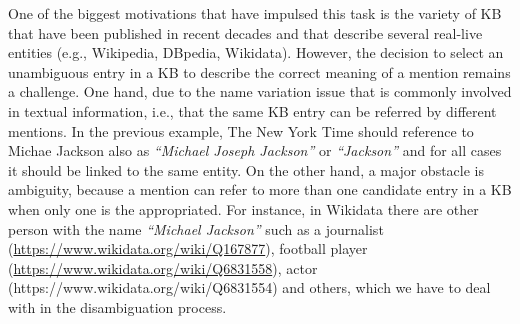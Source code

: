 \documentclass{llncs}
\begin{document}
One of the biggest motivations that have impulsed this task is the variety of KB that have been published in recent decades and that describe several real-live entities (e.g., Wikipedia, DBpedia, Wikidata). However, the decision to select an unambiguous entry in a KB to describe the correct meaning of a mention remains a challenge. One hand, due to the name variation issue that is commonly involved in textual information, i.e., that the same KB entry can be referred by different mentions. In the previous example, The New York Time should reference to Michae Jackson also as \textit{``Michael Joseph Jackson''} or \textit{``Jackson''}  and for all cases it should be linked to the same entity. On the other hand, a major obstacle is ambiguity, because a mention can refer to more than one candidate entry in a KB when only one is the appropriated. For instance, in Wikidata there are other person with the name \textit{``Michael Jackson''} such as a journalist (\url{https://www.wikidata.org/wiki/Q167877}), football player (\url{https://www.wikidata.org/wiki/Q6831558}), actor (https://www.wikidata.org/wiki/Q6831554) and others, which we have to deal with in the disambiguation process. 

\end{document}
